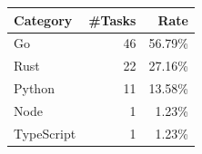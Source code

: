 \begin{tabular}{lrr}
\toprule
Category & \#Tasks & Rate \\
\midrule
Go & 46 & 56.79\% \\
Rust & 22 & 27.16\% \\
Python & 11 & 13.58\% \\
Node & 1 & 1.23\% \\
TypeScript & 1 & 1.23\% \\
\bottomrule
\end{tabular}
